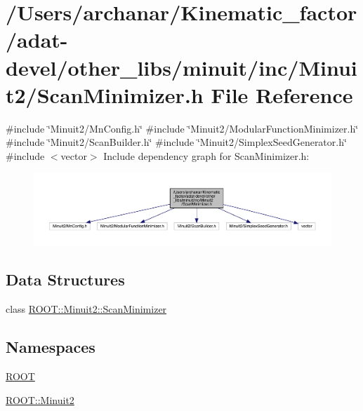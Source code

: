 \hypertarget{adat-devel_2other__libs_2minuit_2inc_2Minuit2_2ScanMinimizer_8h}{}\section{/\+Users/archanar/\+Kinematic\+\_\+factor/adat-\/devel/other\+\_\+libs/minuit/inc/\+Minuit2/\+Scan\+Minimizer.h File Reference}
\label{adat-devel_2other__libs_2minuit_2inc_2Minuit2_2ScanMinimizer_8h}
{\ttfamily \#include \char`\"{}Minuit2/\+Mn\+Config.\+h\char`\"{}}\newline
{\ttfamily \#include \char`\"{}Minuit2/\+Modular\+Function\+Minimizer.\+h\char`\"{}}\newline
{\ttfamily \#include \char`\"{}Minuit2/\+Scan\+Builder.\+h\char`\"{}}\newline
{\ttfamily \#include \char`\"{}Minuit2/\+Simplex\+Seed\+Generator.\+h\char`\"{}}\newline
{\ttfamily \#include $<$vector$>$}\newline
Include dependency graph for Scan\+Minimizer.\+h\+:
\nopagebreak
\begin{figure}[H]
\begin{center}
\leavevmode
\includegraphics[width=350pt]{d5/d86/adat-devel_2other__libs_2minuit_2inc_2Minuit2_2ScanMinimizer_8h__incl}
\end{center}
\end{figure}
\subsection*{Data Structures}
\begin{DoxyCompactItemize}
\item 
class \mbox{\hyperlink{classROOT_1_1Minuit2_1_1ScanMinimizer}{R\+O\+O\+T\+::\+Minuit2\+::\+Scan\+Minimizer}}
\end{DoxyCompactItemize}
\subsection*{Namespaces}
\begin{DoxyCompactItemize}
\item 
 \mbox{\hyperlink{namespaceROOT}{R\+O\+OT}}
\item 
 \mbox{\hyperlink{namespaceROOT_1_1Minuit2}{R\+O\+O\+T\+::\+Minuit2}}
\end{DoxyCompactItemize}
